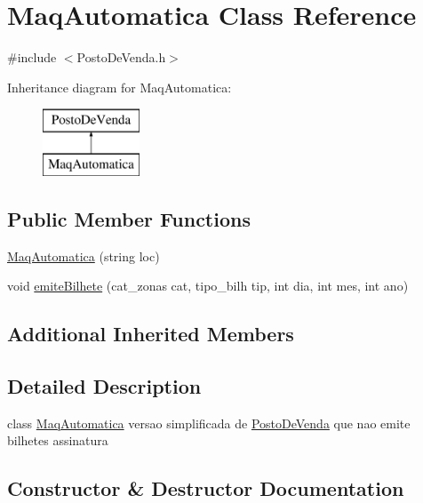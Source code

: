 \hypertarget{class_maq_automatica}{}\section{Maq\+Automatica Class Reference}
\label{class_maq_automatica}


{\ttfamily \#include $<$Posto\+De\+Venda.\+h$>$}

Inheritance diagram for Maq\+Automatica\+:\begin{figure}[H]
\begin{center}
\leavevmode
\includegraphics[height=2.000000cm]{class_maq_automatica}
\end{center}
\end{figure}
\subsection*{Public Member Functions}
\begin{DoxyCompactItemize}
\item 
\mbox{\hyperlink{class_maq_automatica_a66ad0469b8f045078f67d4b7a73fc20f}{Maq\+Automatica}} (string loc)
\item 
void \mbox{\hyperlink{class_maq_automatica_abd628f63dcfc0e9f023b84f187ff3602}{emite\+Bilhete}} (cat\+\_\+zonas cat, tipo\+\_\+bilh tip, int dia, int mes, int ano)
\end{DoxyCompactItemize}
\subsection*{Additional Inherited Members}


\subsection{Detailed Description}
class \mbox{\hyperlink{class_maq_automatica}{Maq\+Automatica}} versao simplificada de \mbox{\hyperlink{class_posto_de_venda}{Posto\+De\+Venda}} que nao emite bilhetes assinatura 

\subsection{Constructor \& Destructor Documentation}
\mbox{\label{class_maq_automatica_a66ad0469b8f045078f67d4b7a73fc20f}} 
